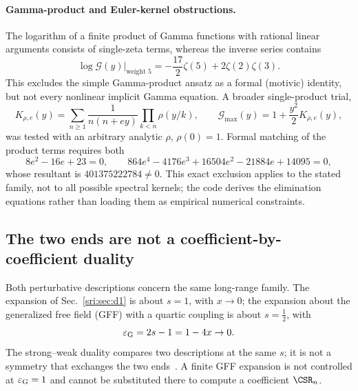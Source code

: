 \paragraph{Gamma-product and Euler-kernel obstructions.} The logarithm of a finite product of Gamma functions with
rational linear arguments consists of single-zeta terms, whereas the inverse series contains
\begin{equation}
 [y^5]\log\mathcal G(y)\big|_{\text{weight }5}=-\frac{17}{2}\zeta(5)+2\zeta(2)\zeta(3).
\end{equation}
This excludes the simple Gamma-product ansatz as a formal (motivic) identity, but not every nonlinear implicit Gamma
equation. A broader single-product trial,
\begin{equation}
 K_{\rho,e}(y)=\sum_{n\ge1}\frac1{n(n+ey)}\prod_{k<n}\rho(y/k),\qquad
 \mathcal G_{\max}(y)=1+\frac{y^2}{2}K_{\rho,e}(y),
\end{equation}
was tested with an arbitrary analytic $\rho$, $\rho(0)=1$. Formal matching of the product terms requires both
\begin{equation}
 8e^2-16e+23=0,\qquad 864e^4-4176e^3+16504e^2-21884e+14095=0,
\end{equation}
whose resultant is $401375222784\ne0$. This exact exclusion applies to the stated family, not to all possible spectral
kernels; the code derives the elimination equations rather than loading them as empirical numerical constraints.

\subsection{The two ends are not a coefficient-by-coefficient duality}\label{sri:app:dualC:endpoints}
Both perturbative descriptions concern the same long-range family. The expansion of Sec.~\ref{sri:sec:d1} is about $s=1$, with
$x\to0$; the expansion about the generalized free field (GFF) with a quartic coupling is about $s=\frac12$, with
\begin{equation}
 \varepsilon_{\rm G}=2s-1=1-4x\to0 .
\end{equation}
The strong--weak duality compares two descriptions at the same $s$; it is not a symmetry that exchanges the two
ends~\cite{sri:Benedetti:2025nzp}. A finite GFF expansion is not controlled at $\varepsilon_{\rm G}=1$ and cannot be
substituted there to compute a coefficient $\CSR_n$.

